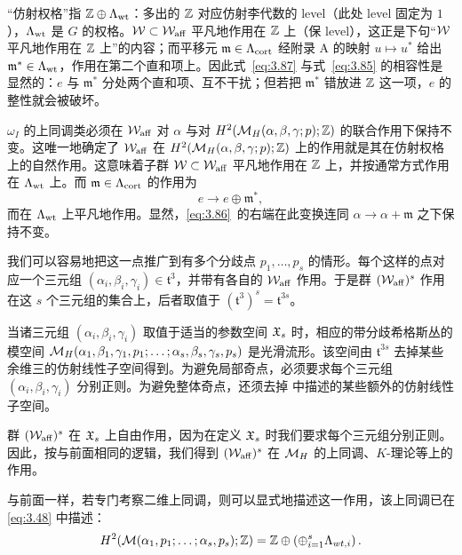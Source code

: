 \begin{yizhu}[含糊点拨]
“仿射权格”指 ${\mathbb{Z}}\oplus\Lambda_{\rm wt}$：多出的 ${\mathbb{Z}}$ 对应仿射李代数的 level（此处 level 固定为 $1$），$\Lambda_{\rm wt}$ 是 $G$ 的权格。${\mathcal W}\subset{\mathcal W}_{\rm aff}$ 平凡地作用在 ${\mathbb{Z}}$ 上（保 level），这正是下句“${\mathcal W}$ 平凡地作用在 ${\mathbb{Z}}$ 上”的内容；而平移元 $\mathfrak m\in\Lambda_{\rm cort}$ 经附录 A 的映射 $u\mapsto u^*$ 给出 $\mathfrak m^*\in\Lambda_{\rm wt}$，作用在第二个直和项上。因此式~\eqref{eq:3.87} 与式~\eqref{eq:3.85} 的相容性是显然的：$e$ 与 $\mathfrak m^*$ 分处两个直和项、互不干扰；但若把 $\mathfrak m^*$ 错放进 ${\mathbb{Z}}$ 这一项，$e$ 的整性就会被破坏。
\end{yizhu}

$\omega_I$ 的上同调类必须在 ${\mathcal W}_{\rm aff}$ 对 $\alpha$ 与对 $H^2({{\mathcal{M}}_H}(\alpha,\beta,\gamma;p);{\mathbb{Z}})$ 的联合作用下保持不变。这唯一地确定了 ${\mathcal W}_{\rm aff}$ 在 $H^2({{\mathcal{M}}_H}(\alpha,\beta,\gamma;p);{\mathbb{Z}})$ 上的作用就是其在仿射权格上的自然作用。这意味着子群 ${\mathcal W}\subset {\mathcal W}_{\rm aff}$ 平凡地作用在 ${\mathbb{Z}}$ 上，并按通常方式作用在 $\Lambda_{\rm wt}$ 上。而 $\mathfrak{m}\in \Lambda_{\rm cort}$ 的作用为
\setcounter{equation}{86}
\begin{equation}\label{eq:3.87}
  e\to e\oplus {\mathfrak{m}}^*,
\end{equation}
而在 $\Lambda_{\rm wt}$ 上平凡地作用。显然，\eqref{eq:3.86}\ 的右端在此变换连同 $\alpha\to\alpha+\mathfrak{m}$ 之下保持不变。

\bigskip{}

我们可以容易地把这一点推广到有多个分歧点 $p_1,\dots,p_s$ 的情形。每个这样的点对应一个三元组 $(\alpha_i,\beta_i,\gamma_i)\in {\mathfrak t}^3$，并带有各自的 ${\mathcal W}_{\rm aff}$ 作用。于是群 $({\mathcal W}_{\rm aff})^s$ 作用在这 $s$ 个三元组的集合上，后者取值于 $(\mathfrak t^3)^s={\mathfrak t}^{3s}$。

当诸三元组 $(\alpha_i,\beta_i,\gamma_i)$ 取值于适当的参数空间 $\mathfrak{X}_s$ 时，相应的带分歧希格斯丛的模空间 ${{\mathcal{M}}_H}(\alpha_1,\beta_1,\gamma_1,p_1; \dots;\alpha_s,\beta_s,\gamma_s,p_s)$ 是光滑流形。该空间由 $\mathfrak t^{3s}$ 去掉某些余维三的仿射线性子空间得到。为避免局部奇点，必须要求每个三元组 $(\alpha_i,\beta_i,\gamma_i)$ 分别正则。为避免整体奇点，还须去掉 \cite{ref24} 中描述的某些额外的仿射线性子空间。

群 $({\mathcal W}_{\rm aff})^s$ 在 $\mathfrak{X}_s$ 上自由作用，因为在定义 $\mathfrak{X}_s$ 时我们要求每个三元组分别正则。因此，按与前面相同的逻辑，我们得到 $({\mathcal W}_{\rm aff})^s$ 在 ${{\mathcal{M}}_H}$ 的上同调、$K$-理论等上的作用。

与前面一样，若专门考察二维上同调，则可以显式地描述这一作用，该上同调已在 \eqref{eq:3.48} 中描述：
\setcounter{equation}{87}
\begin{equation}\label{eq:3.88}
  H^2({\mathcal{M}}(\alpha_1,p_1;\dots;\alpha_s,p_s);{\mathbb{Z}})={\mathbb{Z}}\oplus\left(\oplus_{i=1}^s
\Lambda_{wt,i}\right).
\end{equation}

